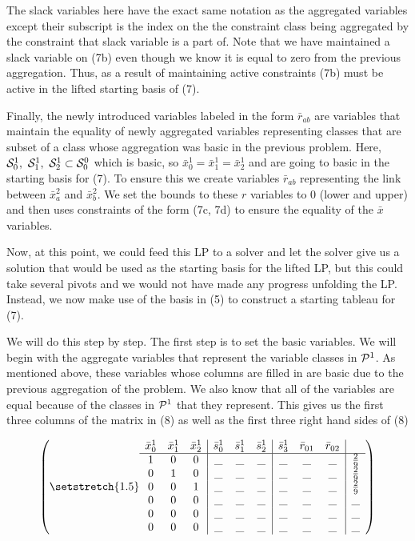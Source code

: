 \documentclass[11pt]{article} %
\newcommand{\cP}{{\cal P}}
\newcommand{\cS}{{\cal S}}
\begin{document}
	The slack variables here have the exact same notation as the aggregated variables except their subscript is the index on the the constraint class being aggregated by the constraint that slack variable is a part of.  Note that we have maintained a slack variable on (7b) even though we know it is equal to zero from the previous aggregation.  Thus, as a result of maintaining active constraints (7b) must be active in the lifted starting basis of (7).
	
	Finally, the newly introduced variables labeled in the form $\bar{r}_{ab}$ are variables that maintain the equality of newly aggregated variables representing classes that are subset of a class whose aggregation was basic in the previous problem.  Here, $\cS^1_0, \ \cS^1_1, \ \cS^1_2 \subset \cS^0_0$ which is basic, so $\bar{x}_0^1 = \bar{x}_1^1 = \bar{x}_2^1$ and are going to basic in the starting basis for (7).  To ensure this we create variables $\bar{r}_{ab}$ representing the link between $\bar{x}_a^2$ and $\bar{x}_b^2$.  We set the bounds to these $r$ variables to 0 (lower and upper) and then uses constraints of the form (7c, 7d) to ensure the equality of the $\bar{x}$ variables.
	
	Now, at this point, we could feed this LP to a solver and let the solver give us a solution that would be used as the starting basis for the lifted LP, but this could take several pivots and we would not have made any progress unfolding the LP.  Instead, we now make use of the basis in (5) to construct a starting tableau for (7). 
	
	We will do this step by step.  The first step is to set the basic variables.  We will begin with the aggregate variables that represent the variable classes in $\cP^1$.  As mentioned above, these variables whose columns are filled in are basic due to the previous aggregation of the problem.  We also know that all of the variables are equal because of the classes in $\cP^1$ that they represent.  This gives us the first three columns of the matrix in (8) as well as the first three right hand sides of (8)
	
	\begin{equation}
	\begin{pmatrix}\setstretch{1.5}
	\begin{array}{ccc|ccc|ccc|c}
	\bar{x}^1_0 & \bar{x}^1_1 & \bar{x}^1_2 & \bar{s}^1_0 & \bar{s}^1_1 & \bar{s}^1_2 & \bar{s}^1_3 & \bar{r}_{01} & \bar{r}_{02} \\
	\hline
	1 & 0 & 0 & \_ & \_ & \_ &\_ & \_ & \_ & \frac{2}{9} \\ 
	0 & 1 & 0 & \_ & \_ & \_ &\_ & \_ & \_ & \frac{2}{9} \\ 
	0 & 0 & 1 & \_& \_ & \_ &\_ & \_ & \_ & \frac{2}{9} \\ 
	0 & 0 & 0 & \_ & \_ & \_ &\_ & \_ & \_& \_ \\ 
	0 & 0 & 0 & \_ & \_ & \_ &\_ & \_ & \_& \_ \\
	0 & 0 & 0 & \_ & \_ & \_ &\_ & \_& \_ & \_ \\
	\end{array}
	\end{pmatrix}
	\end{equation}
	 
\end{document}
